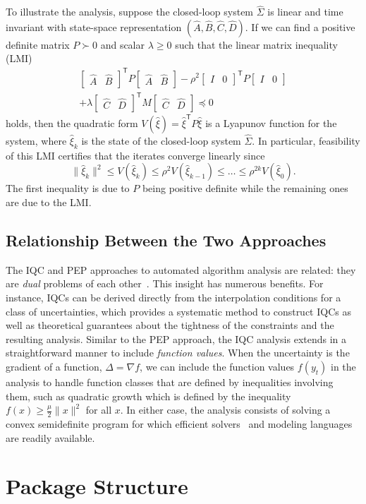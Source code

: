 \documentclass{juliacon}
\def\tp{\mathsf{T}}
\def\df{\nabla\!f}
\newcommand{\bmat}[1]{\begin{bmatrix}#1\end{bmatrix}}
\begin{document}
To illustrate the analysis, suppose the closed-loop system $\hat\Sigma$ is linear and time invariant with state-space representation $(\hat A,\hat B,\hat C,\hat D)$. If we can find a positive definite matrix $P\succ 0$ and scalar $\lambda\geq 0$ such that the linear matrix inequality (LMI)
\begin{multline*}
    \bmat{\hat A & \hat B}^\tp P \bmat{\hat A & \hat B} - \rho^2\bmat{I & 0}^\tp P \bmat{I & 0} \\ + \lambda\bmat{\hat C & \hat D}^\tp M \bmat{\hat C & \hat D} \preceq 0
\end{multline*}
holds, then the quadratic form $V(\hat\xi) = \hat\xi^\tp P \hat\xi$ is a Lyapunov function for the system, where $\hat\xi_k$ is the state of the closed-loop system $\hat\Sigma$. In particular, feasibility of this LMI certifies that the iterates converge linearly since
\[
  \|\hat\xi_k\|^2 \leq V(\hat\xi_k) \leq \rho^2 V(\hat\xi_{k-1}) \leq \ldots \leq \rho^{2k} V(\hat\xi_0).
\]
The first inequality is due to $P$ being positive definite while the remaining ones are due to the LMI.

\subsection{Relationship Between the Two Approaches}

The IQC and PEP approaches to automated algorithm analysis are related: they are \textit{dual} problems of each other~\cite{taylor2018lyapunov}. This insight has numerous benefits. For instance, IQCs can be derived directly from the interpolation conditions for a class of uncertainties, which provides a systematic method to construct IQCs as well as theoretical guarantees about the tightness of the constraints and the resulting analysis. Similar to the PEP approach, the IQC analysis extends in a straightforward manner to include \textit{function values}. When the uncertainty is the gradient of a function, $\Delta = \df$, we can include the function values $f(y_t)$ in the analysis to handle function classes that are defined by inequalities involving them, such as quadratic growth which is defined by the inequality $f(x) \geq \frac{\mu}{2} \|x\|^2$ for all $x$. In either case, the analysis consists of solving a convex semidefinite program for which efficient solvers~\cite{mosek,cosmo,scs} and modeling languages~\cite{yalmip,cvx1,cvx2} are readily available.

\section{Package Structure}
\end{document}
